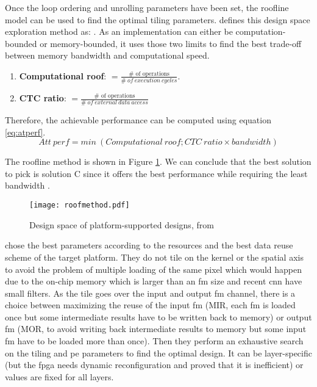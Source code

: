 Once the loop ordering and unrolling parameters have been set, the roofline model can be used to find the optimal tiling parameters. \textcite{mittal_survey_2020} defines this design space exploration method as: . As an implementation can either be computation-bounded or memory-bounded, it uses those two limits to find the best trade-off between memory bandwidth and computational speed.
\begin{enumerate}
    \item \textbf{Computational roof}: $= \frac{\text{\# \ of \ operations}}{\# \ of \ execution \ cycles}$.
    \item \textbf{CTC ratio}: $= \frac{\text{\# \ of \ operations}}{\# \ of \ external \ data \ access}$
\end{enumerate}
Therefore, the achievable performance can be computed using equation \ref{eq:atperf}.
\begin{equation}
Att \ perf = min \ (Computational \ roof; CTC \ ratio \times bandwidth)
\label{eq:atperf}
\end{equation}

The roofline method is shown in Figure \ref{fig:roofmeth}. We can conclude that the best solution to pick is solution C since it offers the best performance while requiring the least bandwidth \cite{zhang_optimizing_2015}.
%
\begin{figure}[H]
    \centering
    \texttt{[image: roofmethod.pdf]}
    \caption{Design space of platform-supported designs, from \cite{zhang_optimizing_2015}}
    \label{fig:roofmeth}
\end{figure}

\textcite{motamedi_placid_2017} chose the best parameters according to the resources and the best data reuse scheme of the target platform. They do not tile on the kernel or the spatial axis to avoid the problem of multiple loading of the same pixel which would happen due to the on-chip memory which is larger than an \acrshort{fm} size and recent \acrshort{cnn} have small filters. As the tile goes over the input and output \acrshort{fm} channel, there is a choice between maximizing the reuse of the input \acrshort{fm} (MIR, each \acrshort{fm} is loaded once but some intermediate results have to be written back to memory) or output \acrshort{fm} (MOR, to avoid writing back intermediate results to memory but some input \acrshort{fm} have to be loaded more than once). Then they perform an exhaustive search on the tiling and \acrshort{pe} parameters to find the optimal design. It can be layer-specific (but the \acrshort{fpga} needs dynamic reconfiguration and \textcite{zhang_optimizing_2015} proved that it is inefficient) or values are fixed for all layers.

